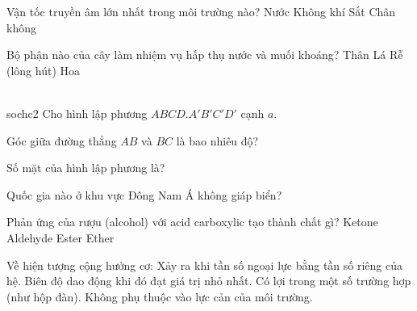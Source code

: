 \begin{ex}
    Vận tốc truyền âm lớn nhất trong môi trường nào?
    \choice
    {Nước}
    {Không khí}
    {\True Sắt}
    {Chân không}
\end{ex}

\begin{ex}
    Bộ phận nào của cây làm nhiệm vụ hấp thụ nước và muối khoáng?
    \choice
    {Thân}
    {Lá}
    {\True Rễ (lông hút)}
    {Hoa}
\end{ex}

\begin{ex}
    \\sochc{2}{
        Cho hình lập phương $ABCD.A'B'C'D'$ cạnh $a$.
    }
    \begin{chc}
        Góc giữa đường thẳng $AB$ và $BC$ là bao nhiêu độ?
    \end{chc}
    \begin{chc}
        Số mặt của hình lập phương là?
    \end{chc}
\end{ex}

\begin{ex}
    Quốc gia nào ở khu vực Đông Nam Á không giáp biển?

\end{ex}

\begin{ex}
    Phản ứng của rượu (alcohol) với acid carboxylic tạo thành chất gì?
    \choice
    {Ketone}
    {Aldehyde}
    {\True Ester}
    {Ether}
\end{ex}

\begin{ex}
    Về hiện tượng cộng hưởng cơ:
    \choiceTF
    {\True Xảy ra khi tần số ngoại lực bằng tần số riêng của hệ.}
    {Biên độ dao động khi đó đạt giá trị nhỏ nhất.}
    {\True Có lợi trong một số trường hợp (như hộp đàn).}
    {Không phụ thuộc vào lực cản của môi trường.}
\end{ex}

